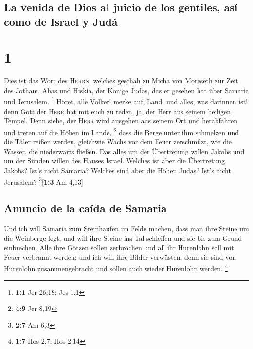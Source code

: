 \hypertarget{la-venida-de-dios-al-juicio-de-los-gentiles-asuxed-como-de-israel-y-juduxe1}{%
\subsection{La venida de Dios al juicio de los gentiles, así como de
Israel y
Judá}\label{la-venida-de-dios-al-juicio-de-los-gentiles-asuxed-como-de-israel-y-juduxe1}}

\hypertarget{section}{%
\section{1}\label{section}}

 Dies ist das Wort des \textsc{Herrn}, welches geschah zu
Micha von Moreseth zur Zeit des Jotham, Ahas und Hiskia, der Könige
Judas, das er gesehen hat über Samaria und Jerusalem. \footnote{\textbf{1:1}
  Jer 26,18; Jes 1,1}  Höret, alle Völker! merke auf,
Land, und alles, was darinnen ist! denn Gott der \textsc{Herr} hat mit
euch zu reden, ja, der Herr aus seinem heiligen Tempel. 
Denn siehe, der \textsc{Herr} wird ausgehen aus seinem Ort und
herabfahren und treten auf die Höhen im Lande, \footnote{\textbf{4:9}
  Jer 8,19}  dass die Berge unter ihm schmelzen und die
Täler reißen werden, gleichwie Wachs vor dem Feuer zerschmilzt, wie die
Wasser, die niederwärts fließen.  Das alles um der
Übertretung willen Jakobs und um der Sünden willen des Hauses Israel.
Welches ist aber die Übertretung Jakobs? Ist's nicht Samaria? Welches
sind aber die Höhen Judas? Ist's nicht Jerusalem?
\footnote{\textbf{2:7} Am 6,3}{[}\textbf{1:3} Am 4,13{]}

\hypertarget{anuncio-de-la-cauxedda-de-samaria}{%
\subsection{Anuncio de la caída de
Samaria}\label{anuncio-de-la-cauxedda-de-samaria}}

 Und ich will Samaria zum Steinhaufen im Felde machen,
dass man ihre Steine um die Weinberge legt, und will ihre Steine ins Tal
schleifen und sie bis zum Grund einbrechen.  Alle ihre
Götzen sollen zerbrochen und all ihr Hurenlohn soll mit Feuer verbrannt
werden; und ich will ihre Bilder verwüsten, denn sie sind von Hurenlohn
zusammengebracht und sollen auch wieder Hurenlohn werden. \footnote{\textbf{1:7}
  Hos 2,7; Hos 2,14}

